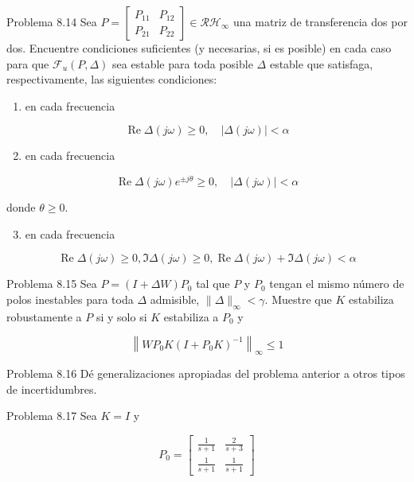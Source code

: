 Problema 8.14 Sea $P=\left[\begin{array}{ll}P_{11} & P_{12} \\ P_{21} & P_{22}\end{array}\right] \in \mathcal{R} \mathcal{H}_{\infty}$ una matriz de transferencia dos por dos. Encuentre condiciones suficientes (y necesarias, si es posible) en cada caso para que $\mathcal{F}_{u}(P, \Delta)$ sea estable para toda posible $\Delta$ estable que satisfaga, respectivamente, las siguientes condiciones:

\begin{enumerate}
  \item en cada frecuencia
\end{enumerate}

$$
\operatorname{Re} \Delta(j \omega) \geq 0, \quad|\Delta(j \omega)|<\alpha
$$

\begin{enumerate}
  \setcounter{enumi}{1}
  \item en cada frecuencia
\end{enumerate}

$$
\operatorname{Re} \Delta(j \omega) e^{ \pm j \theta} \geq 0, \quad|\Delta(j \omega)|<\alpha
$$

donde $\theta \geq 0$.

\begin{enumerate}
  \setcounter{enumi}{2}
  \item en cada frecuencia
\end{enumerate}

$$
\operatorname{Re} \Delta(j \omega) \geq 0, \Im \Delta(j \omega) \geq 0, \operatorname{Re} \Delta(j \omega)+\Im \Delta(j \omega)<\alpha
$$

Problema 8.15 Sea $P=(I+\Delta W) P_{0}$ tal que $P$ y $P_{0}$ tengan el mismo número de polos inestables para toda $\Delta$ admisible, $\|\Delta\|_{\infty}<\gamma$. Muestre que $K$ estabiliza robustamente a $P$ si y solo si $K$ estabiliza a $P_{0}$ y

$$
\left\|W P_{0} K\left(I+P_{0} K\right)^{-1}\right\|_{\infty} \leq 1
$$

Problema 8.16 Dé generalizaciones apropiadas del problema anterior a otros tipos de incertidumbres.

Problema 8.17 Sea $K=I$ y

$$
P_{0}=\left[\begin{array}{cc}
\frac{1}{s+1} & \frac{2}{s+3} \\
\frac{1}{s+1} & \frac{1}{s+1}
\end{array}\right]
$$

